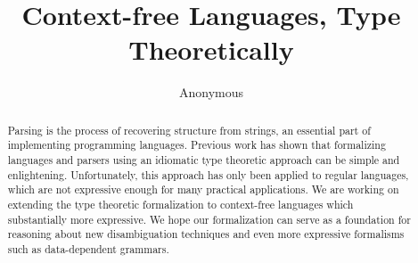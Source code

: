 \documentclass[runningheads]{llncs}
\begin{document}
%
\title{Context-free Languages, Type Theoretically}
%
%
\author{Anonymous}
%
%

\maketitle              %

\begin{abstract}
Parsing is the process of recovering structure from strings, an essential part of implementing programming languages.
Previous work has shown that formalizing languages and parsers using an idiomatic type theoretic approach can be simple and enlightening.
Unfortunately, this approach has only been applied to regular languages, which are not expressive enough for many practical applications.
We are working on extending the type theoretic formalization to context-free languages which substantially more expressive.
We hope our formalization can serve as a foundation for reasoning about new disambiguation techniques and even more expressive formalisms such as data-dependent grammars.
\end{abstract}
\end{document}
